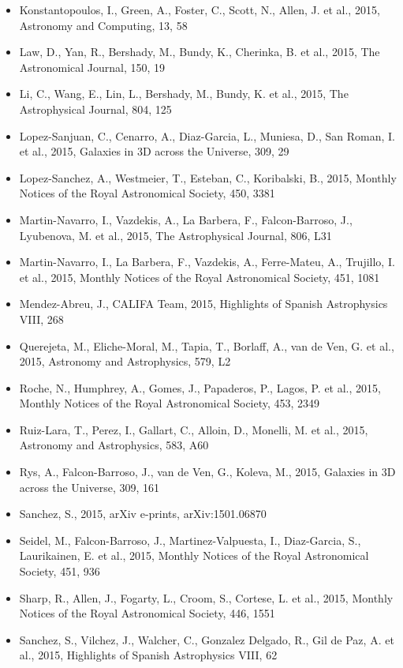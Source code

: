 \documentclass{letter}
\begin{document}
\begin{enumerate}
\begin{itemize}
\item Konstantopoulos, I., Green, A., Foster, C., Scott, N., Allen, J. et al., 2015, Astronomy and Computing, 13, 58
\item Law, D., Yan, R., Bershady, M., Bundy, K., Cherinka, B. et al., 2015, The Astronomical Journal, 150, 19
\item Li, C., Wang, E., Lin, L., Bershady, M., Bundy, K. et al., 2015, The Astrophysical Journal, 804, 125
\item Lopez-Sanjuan, C., Cenarro, A., Diaz-Garcia, L., Muniesa, D., San Roman, I. et al., 2015, Galaxies in 3D across the Universe, 309, 29
\item Lopez-Sanchez, A., Westmeier, T., Esteban, C., Koribalski, B., 2015, Monthly Notices of the Royal Astronomical Society, 450, 3381
\item Martin-Navarro, I., Vazdekis, A., La Barbera, F., Falcon-Barroso, J., Lyubenova, M. et al., 2015, The Astrophysical Journal, 806, L31
\item Martin-Navarro, I., La Barbera, F., Vazdekis, A., Ferre-Mateu, A., Trujillo, I. et al., 2015, Monthly Notices of the Royal Astronomical Society, 451, 1081
\item Mendez-Abreu, J., CALIFA Team, 2015, Highlights of Spanish Astrophysics VIII, 268
\item Querejeta, M., Eliche-Moral, M., Tapia, T., Borlaff, A., van de Ven, G. et al., 2015, Astronomy and Astrophysics, 579, L2
\item Roche, N., Humphrey, A., Gomes, J., Papaderos, P., Lagos, P. et al., 2015, Monthly Notices of the Royal Astronomical Society, 453, 2349
\item Ruiz-Lara, T., Perez, I., Gallart, C., Alloin, D., Monelli, M. et al., 2015, Astronomy and Astrophysics, 583, A60
\item Rys, A., Falcon-Barroso, J., van de Ven, G., Koleva, M., 2015, Galaxies in 3D across the Universe, 309, 161
\item Sanchez, S., 2015, arXiv e-prints, arXiv:1501.06870
\item Seidel, M., Falcon-Barroso, J., Martinez-Valpuesta, I., Diaz-Garcia, S., Laurikainen, E. et al., 2015, Monthly Notices of the Royal Astronomical Society, 451, 936
\item Sharp, R., Allen, J., Fogarty, L., Croom, S., Cortese, L. et al., 2015, Monthly Notices of the Royal Astronomical Society, 446, 1551
\item Sanchez, S., Vilchez, J., Walcher, C., Gonzalez Delgado, R., Gil de Paz, A. et al., 2015, Highlights of Spanish Astrophysics VIII, 62

\end{itemize}
\end{enumerate}
\end{document}
